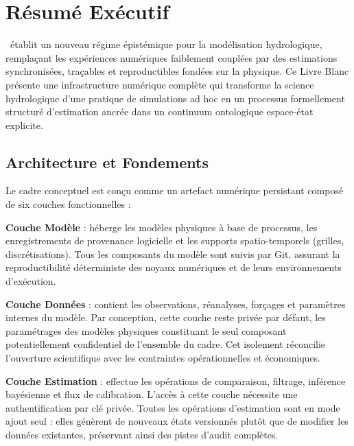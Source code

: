 \chapter*{Résumé Exécutif}
{}
\fancyhead[LE]{\thepage} 
\fancyhead[RO]{\thepage} 
\fancyfoot[C]{\thepage}

\renewcommand{\headrulewidth}{0.1pt}

\setlength{\parindent}{0cm} %
\setlength{\parskip}{9pt}
\vspace{-1cm}

\htastarget



\hydrot\ établit un nouveau régime épistémique pour la modélisation hydrologique, remplaçant les expériences numériques faiblement couplées par des estimations synchronisées, traçables et reproductibles fondées sur la physique. Ce Livre Blanc présente une infrastructure numérique complète qui transforme la science hydrologique d'une pratique de simulations ad hoc en un processus formellement structuré d'estimation ancrée dans un continuum ontologique espace-état explicite.

\section*{Architecture et Fondements}

Le cadre conceptuel est conçu comme un artefact numérique persistant composé de six couches fonctionnelles :

\textbf{Couche Modèle} : héberge les modèles physiques à base de processus, les enregistrements de provenance logicielle et les supports spatio-temporels (grilles, discrétisations). Tous les composants du modèle sont suivis par Git, assurant la reproductibilité déterministe des noyaux numériques et de leurs environnements d'exécution.

\textbf{Couche Données} : contient les observations, réanalyses, forçages et paramètres internes du modèle. Par conception, cette couche reste privée par défaut, les paramétrages des modèles physiques constituant le seul composant potentiellement confidentiel de l'ensemble du cadre. Cet isolement réconcilie l'ouverture scientifique avec les contraintes opérationnelles et économiques.

\textbf{Couche Estimation} : effectue les opérations de comparaison, filtrage, inférence bayésienne et flux de calibration. L'accès à cette couche nécessite une authentification par clé privée. Toutes les opérations d'estimation sont en mode ajout seul : elles génèrent de nouveaux états versionnés plutôt que de modifier les données existantes, préservant ainsi des pistes d'audit complètes.

